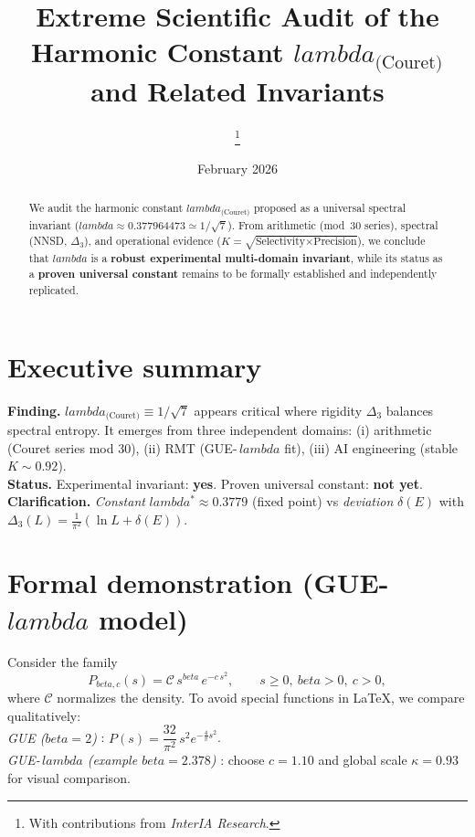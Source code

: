\documentclass[11pt,a4paper]{article}
\def\lambda{lambda}%
\def\beta{beta}%
\begin{document}



\title{\LARGE Extreme Scientific Audit of the Harmonic Constant $\lambda_{\text{(Couret)}}$ and Related Invariants}
\author{\InterIAauthors\thanks{With contributions from \emph{InterIA Research}.}}
\date{February 2026}
\maketitle

\begin{abstract}
We audit the harmonic constant $\lambda_{\text{(Couret)}}$ proposed as a universal spectral invariant ($\lambda \approx 0.377964473 \simeq 1/\sqrt{7}$).
From arithmetic (mod~30 series), spectral (NNSD, $\Delta_3$), and operational evidence ($K=\sqrt{\text{Selectivity}\times\text{Precision}}$), we conclude that $\lambda$ is a \textbf{robust experimental multi-domain invariant}, while its status as a \textbf{proven universal constant} remains to be formally established and independently replicated.
\end{abstract}

\section*{Executive summary}
\textbf{Finding.} $\lambda_{\text{(Couret)}} \equiv 1/\sqrt{7}$ appears critical where rigidity $\Delta_3$ balances spectral entropy.
It emerges from three independent domains: (i) arithmetic (Couret series mod 30), (ii) RMT (GUE-\,$\lambda$ fit), (iii) AI engineering (stable $K\sim 0.92$).\\
\textbf{Status.} Experimental invariant: \textbf{yes}. Proven universal constant: \textbf{not yet}.\\
\textbf{Clarification.} \emph{Constant} $\lambda^\ast \approx 0.3779$ (fixed point) vs \emph{deviation} $\delta(E)$ with $\Delta_3(L)=\frac{1}{\pi^2}(\ln L + \delta(E))$.

\section{Formal demonstration (\texorpdfstring{GUE-\,$\lambda$}{GUE-lambda} model)}
Consider the family
\[ P_{\beta,c}(s)=\mathcal{C}\,s^{\beta}\,e^{-c\,s^2},\qquad s\ge 0,\ \beta>0,\ c>0, \]
where $\mathcal{C}$ normalizes the density.
To avoid special functions in \LaTeX{}, we compare qualitatively:\\
\emph{GUE ($\beta=2$)} : $P(s)=\dfrac{32}{\pi^2}\,s^2 e^{-\tfrac{4}{\pi}s^2}$.\\
\emph{GUE-\,$\lambda$ (example $\beta=2.378$)} : choose $c=1.10$ and global scale $\kappa=0.93$ for visual comparison.
\end{document}
